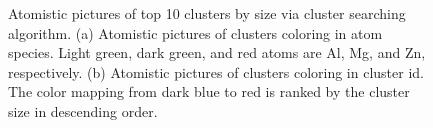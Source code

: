 \begingroup
\begin{figure}[!ht]
  \centering
\caption[Atomistic pictures of top 10 clusters by size via cluster searching algorithm.]{Atomistic pictures of top 10 clusters by size via cluster searching algorithm. (a) Atomistic pictures of clusters coloring in atom species. Light green, dark green, and red atoms are Al, Mg, and Zn, respectively. (b) Atomistic pictures of clusters coloring in cluster id. The color mapping from dark blue to red is ranked by the cluster size in descending order.}
\label{Chap:Al/Vac:fig:illu_cluster}
\end{figure}
\endgroup


